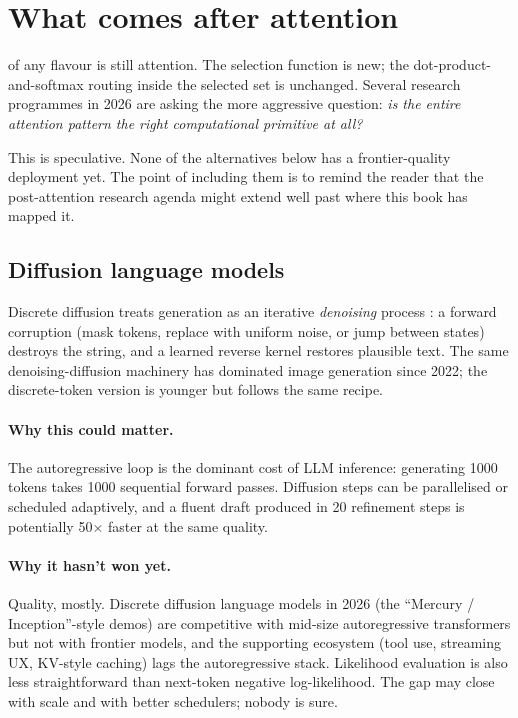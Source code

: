\section{What comes after attention}
\label{ch:post-attention}

 of any flavour is still attention. The
selection function is new; the dot-product-and-softmax routing inside the
selected set is unchanged. Several research programmes in 2026 are asking
the more aggressive question: \emph{is the entire attention pattern
the right computational primitive at all?}

This is speculative. None of the alternatives below has a frontier-quality
deployment yet. The point of including them is to remind the reader that
the post-attention research agenda might extend well past where this book has
mapped it.

\subsection{Diffusion language models}

Discrete diffusion treats generation as an iterative \emph{denoising}
process \citep{hoogeboom2021multinomial,lou2024discrete}: a forward
corruption (mask tokens, replace with uniform noise, or jump between
states) destroys the string, and a learned reverse kernel restores
plausible text. The same denoising-diffusion machinery has dominated
image generation since 2022; the discrete-token version is younger but
follows the same recipe.

\paragraph{Why this could matter.} The autoregressive loop is the
dominant cost of LLM inference: generating 1000 tokens takes 1000
sequential forward passes. Diffusion steps can be parallelised or
scheduled adaptively, and a fluent draft produced in 20 refinement steps
is potentially 50$\times$ faster at the same quality.

\paragraph{Why it hasn't won yet.} Quality, mostly. Discrete diffusion
language models in 2026 (the ``Mercury / Inception''-style demos) are
competitive with mid-size autoregressive transformers but not with
frontier models, and the supporting ecosystem (tool use, streaming UX,
KV-style caching) lags the autoregressive stack. Likelihood evaluation
is also less straightforward than next-token negative log-likelihood.
The gap may close with scale and with better schedulers; nobody is
sure.

